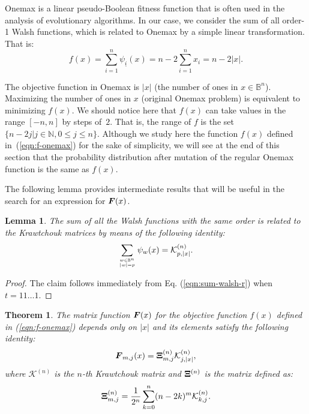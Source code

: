 \documentclass{article}
\newtheorem{theorem}{Theorem}
\newtheorem{lemma}{Lemma}
\def\vec#1{\mathchoice{\mbox{\boldmath$\displaystyle#1$}}
  {\mbox{\boldmath$\textstyle#1$}}
  {\mbox{\boldmath$\scriptstyle#1$}}
  {\mbox{\boldmath$\scriptscriptstyle#1$}}}
\newcommand{\Bo}[0]{\mathbb{B}}
\newcommand{\krawel}[3]{\mathcal{K}^{#1}_{#2,#3}}
\newcommand{\kraw}[1]{\mathcal{K}^{#1}}
\begin{document}
Onemax is a linear pseudo-Boolean fitness function that is often used in the analysis of evolutionary algorithms. In our case, we consider the sum of all order-1 Walsh functions, which is related to Onemax by a simple linear transformation. That is:
\begin{equation}
\label{eqn:f-onemax}
f(x) = \sum_{i=1}^{n} \psi_{\underline{i}}(x) =  n - 2 \sum_{i=1}^{n} x_i = n - 2 |x| .
\end{equation}

The objective function in Onemax is $|x|$ (the number of ones in $x \in \Bo^n$).
Maximizing the number of ones in $x$ (original Onemax problem) is equivalent to minimizing $f(x)$.
We should notice here that $f(x)$ can take values in the range $[-n,n]$ by steps of~$2$. That is, the range of $f$ is the set $\{n-2j|j\in\mathbb{N}, 0\leq j \leq n\}$. Although we study here the function $f(x)$ defined in~(\ref{eqn:f-onemax}) for the sake of simplicity, we will see at the end of this section that the probability distribution after mutation of the regular Onemax function is the same as $f(x)$.

The following lemma provides intermediate results that will be useful in the search for an expression for  $\vec{F}(x)$.

\begin{lemma}
\label{lem:sum-walsh}
The sum of all the Walsh functions with the same order is related to the Krawtchouk matrices by means of the following identity:
\begin{equation}
\sum_{w \in \Bo^n \atop |w| = p} \psi_{w}(x) = \krawel{(n)}{p}{|x|}.
\end{equation}
\end{lemma}
\begin{proof}
The claim follows immediately from Eq. (\ref{eqn:sum-walsh-r}) when $t=11\dots 1$.\end{proof}

\begin{theorem}
\label{thm:fmatrix-onemax}
The matrix function $\vec{F}(x)$ for the objective function $f(x)$ defined in (\ref{eqn:f-onemax}) depends only on $|x|$ and its elements satisfy the following identity:
\begin{equation}
\label{eqn:matrix-f-onemax}
\vec{F}_{m,j}(x) = \vec{\Xi}^{(n)}_{m,j} \krawel{(n)}{j}{|x|}  ,
\end{equation}
where $\kraw{(n)}$ is the $n$-th Krawtchouk matrix and $\vec{\Xi}^{(n)}$ is the matrix defined as:
\begin{equation}
\label{eqn:xi}
\vec{\Xi}^{(n)}_{m,j} = \frac{1}{2^n} \sum_{k=0}^n (n-2k)^m \krawel{(n)}{k}{j} .
\end{equation}
\end{theorem}
\end{document}
